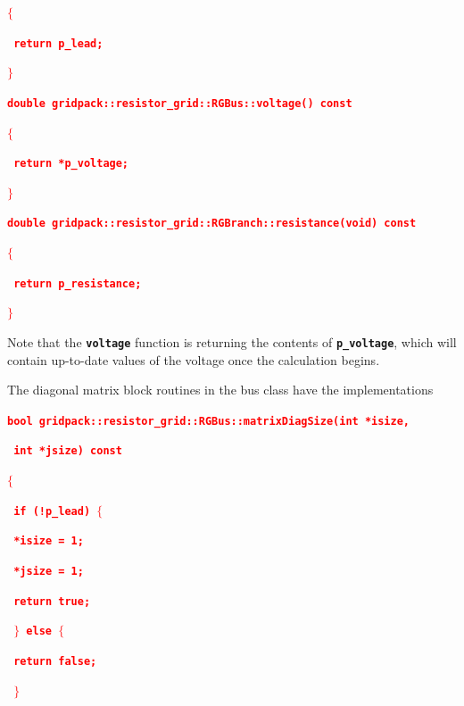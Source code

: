\documentclass[12pt]{report} %
\begin{document}
\textcolor{red}{\texttt{\textbf{$\boldsymbol{\mathrm{\{}}$}}}

\textcolor{red}{\texttt{\textbf{  return p\_lead;}}}

\textcolor{red}{\texttt{\textbf{$\boldsymbol{\mathrm{\}}}$}}}

\textcolor{red}{\texttt{\textbf{double gridpack::resistor\_grid::RGBus::voltage() const}}}

\textcolor{red}{\texttt{\textbf{$\boldsymbol{\mathrm{\{}}$}}}

\textcolor{red}{\texttt{\textbf{  return *p\_voltage;}}}

\textcolor{red}{\texttt{\textbf{$\boldsymbol{\mathrm{\}}}$}}}

\textcolor{red}{\texttt{\textbf{double gridpack::resistor\_grid::RGBranch::resistance(void) const}}}

\textcolor{red}{\texttt{\textbf{$\boldsymbol{\mathrm{\{}}$}}}

\textcolor{red}{\texttt{\textbf{  return p\_resistance;}}}

\textcolor{red}{\texttt{\textbf{$\boldsymbol{\mathrm{\}}}$}}}

Note that the \texttt{\textbf{voltage}} function is returning the contents of \texttt{\textbf{p\_voltage}}, which will contain up-to-date values of the voltage once the calculation begins.

The diagonal matrix block routines in the bus class have the implementations

\textcolor{red}{\texttt{\textbf{bool gridpack::resistor\_grid::RGBus::matrixDiagSize(int *isize,}}}

\textcolor{red}{\texttt{\textbf{   int *jsize) const}}}

\textcolor{red}{\texttt{\textbf{$\boldsymbol{\mathrm{\{}}$}}}

\textcolor{red}{\texttt{\textbf{  if (!p\_lead) $\boldsymbol{\mathrm{\{}}$}}}

\textcolor{red}{\texttt{\textbf{   *isize = 1;}}}

\textcolor{red}{\texttt{\textbf{   *jsize = 1;}}}

\textcolor{red}{\texttt{\textbf{   return true;}}}

\textcolor{red}{\texttt{\textbf{  $\boldsymbol{\mathrm{\}}}$ else $\boldsymbol{\mathrm{\{}}$}}}

\textcolor{red}{\texttt{\textbf{    return false;}}}

\textcolor{red}{\texttt{\textbf{  $\boldsymbol{\mathrm{\}}}$}}}
\end{document}
